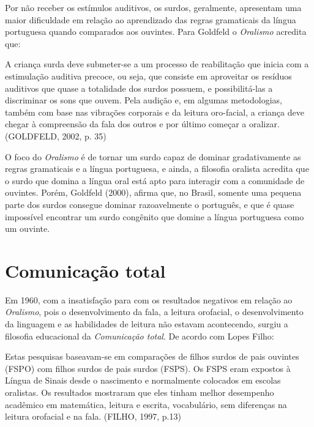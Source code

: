\documentclass[brasil]{abnt}
\begin{document}
		 Por não receber os estímulos auditivos, os surdos, geralmente, apresentam uma maior dificuldade em relação ao aprendizado das regras gramaticais da língua portuguesa quando comparados 
		 aos ouvintes. Para Goldfeld o \textit{Oralismo} acredita que:
		 
			\begin{citacao} A criança surda deve submeter-se a um processo de reabilitação que inicia com a estimulação auditiva precoce, ou seja, que consiste em aproveitar os resíduos auditivos que quase a 
							totalidade dos surdos possuem, e possibilitá-las a discriminar os sons que ouvem. Pela audição e, em algumas metodologias, também com base nas vibrações corporais e da leitura 
							oro-facial, a criança deve chegar à compreensão da fala dos outros e por último começar a oralizar. (GOLDFELD, 2002, p. 35) 
			\end{citacao}
		
		O foco do \textit{Oralismo} é de tornar um surdo capaz de dominar gradativamente as regras gramaticais e a língua portuguesa, e ainda, a filosofia oralista acredita que o surdo que domina a língua 
		oral está apto para interagir com a comunidade de ouvintes. Porém, Goldfeld (2000), afirma que, no Brasil, somente uma pequena parte dos surdos consegue dominar razoavelmente o português, e que é quase 
		impossível encontrar um surdo congênito que domine a língua portuguesa como um ouvinte.
		
		 
		\section{Comunicação total}
		Em 1960, com a insatisfação para com os resultados negativos em relação ao \textit{Oralismo}, pois o desenvolvimento da fala, a leitura orofacial, o desenvolvimento da linguagem e as habilidades de 
		leitura não estavam acontecendo, surgiu a filosofia educacional da \textit{Comunicação total}. De acordo com Lopes Filho:
		
			\begin{citacao} Estas pesquisas baseavam-se em comparações de filhos surdos de pais ouvintes (FSPO) com filhos surdos de pais surdos (FSPS). Os FSPS eram expostos à Língua de Sinais desde o 
							nascimento e normalmente colocados em escolas oralistas. Os resultados mostraram que eles tinham melhor desempenho acadêmico em matemática, leitura e escrita, vocabulário, sem 
							diferenças na leitura orofacial e na fala. (FILHO, 1997, p.13)
			\end{citacao}
		  
\end{document}
